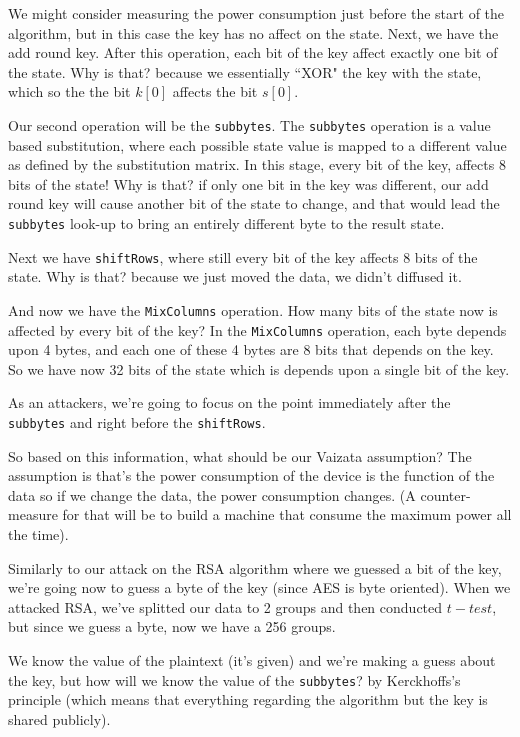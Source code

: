 We might consider measuring the power consumption just before the start of the
algorithm, but in this case the key has no affect on the state. Next, we have
the add round key. After this operation, each bit of the key affect exactly one
bit of the state. Why is that? because we essentially ``XOR" the key with the
state, which so the the bit $k[0]$ affects the bit $s[0]$.

Our second operation will be the \texttt{subbytes}. The \texttt{subbytes}
operation is a value based substitution, where each possible state value is
mapped to a different value as defined by the substitution matrix. In this
stage, every bit of the key, affects 8 bits of the state! Why is that? if only
one bit in the key was different, our add round key will cause another bit of
the state to change, and that would lead the \texttt{subbytes} look-up to bring
an entirely different byte to the result state.

Next we have \texttt{shiftRows}, where still every bit of the key affects 8 bits
of the state. Why is that? because we just moved the data, we didn't diffused
it.

And now we have the \texttt{MixColumns} operation. How many bits of the state
now is affected by every bit of the key? In the \texttt{MixColumns} operation,
each byte depends upon 4 bytes, and each one of these 4 bytes are 8 bits that
depends on the key. So we have now 32 bits of the state which is depends upon a
single bit of the key.

As an attackers, we're going to focus on the point immediately after the
\texttt{subbytes} and right before the \texttt{shiftRows}. 

So based on this information, what should be our Vaizata assumption? The
assumption is that's the power consumption of the device is the function of the
data so if we change the data, the power consumption changes. (A counter-measure
for that will be to build a machine that consume the maximum power all the
time).

Similarly to our attack on the RSA algorithm where we guessed a bit of the key,
we're going now to guess a byte of the key (since AES is byte oriented). When we
attacked RSA, we've splitted our data to 2 groups and then conducted $t-test$,
but since we guess a byte, now we have a 256 groups. 

We know the value of the plaintext (it's given) and we're making a guess about
the key, but how will we know the value of the \texttt{subbytes}? by
Kerckhoffs's principle (which means that everything regarding the algorithm but
the key is shared publicly).

